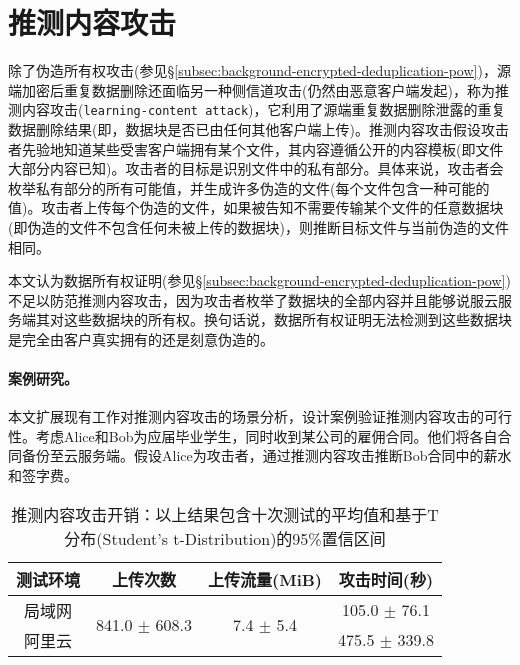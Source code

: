 \section{推测内容攻击}
\label{sec:featurespy-attack}

除了伪造所有权攻击(参见\S\ref{subsec:background-encrypted-deduplication-pow})，源端加密后重复数据删除还面临另一种侧信道攻击(仍然由恶意客户端发起)，称为推测内容攻击({\tt learning-content attack})\cite{harnik2010side, zuo2018mitigating}，它利用了源端重复数据删除泄露的重复数据删除结果(即，数据块是否已由任何其他客户端上传)。推测内容攻击假设攻击者先验地知道某些受害客户端拥有某个文件，其内容遵循公开的内容模板(即文件大部分内容已知)。攻击者的目标是识别文件中的私有部分。具体来说，攻击者会枚举私有部分的所有可能值，并生成许多伪造的文件(每个文件包含一种可能的值)。攻击者上传每个伪造的文件，如果被告知不需要传输某个文件的任意数据块(即伪造的文件不包含任何未被上传的数据块)，则推断目标文件与当前伪造的文件相同。

本文认为数据所有权证明\cite{halevi11}(参见\S\ref{subsec:background-encrypted-deduplication-pow})不足以防范推测内容攻击，因为攻击者枚举了数据块的全部内容并且能够说服云服务端其对这些数据块的所有权。换句话说，数据所有权证明无法检测到这些数据块是完全由客户真实拥有的还是刻意伪造的。

\paragraph*{案例研究。}
本文扩展现有工作\cite{harnik2010side,zuo2018mitigating}对推测内容攻击的场景分析，设计案例验证推测内容攻击的可行性。考虑Alice和Bob为应届毕业学生，同时收到某公司的雇佣合同。他们将各自合同备份至云服务端。假设Alice为攻击者，通过推测内容攻击推断Bob合同中的薪水和签字费。

\begin{table}[!htb]
    \small
    \centering
    \begin{tabular}{@{}cccc@{}}
        \toprule
        测试环境 & 上传次数                           & 上传流量(MiB)                  & 攻击时间(秒)      \\ \midrule
        局域网   & \multirow{2}{*}{841.0 $\pm$ 608.3} & \multirow{2}{*}{7.4 $\pm$ 5.4} & 105.0 $\pm$ 76.1  \\
        阿里云   &                                    &                                & 475.5 $\pm$ 339.8 \\
        \bottomrule
    \end{tabular}
    \caption{推测内容攻击开销：以上结果包含十次测试的平均值和基于T分布(Student's t-Distribution)的95\%置信区间}
    \label{tab:LRI-verify}
\end{table}

